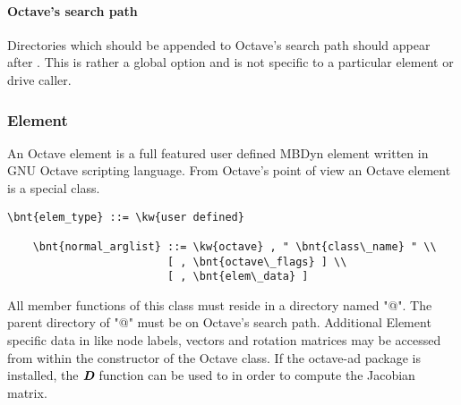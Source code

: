 \paragraph{Octave's search path}
Directories which should be appended to Octave's search path should appear after .
This is rather a global option and is not specific to a particular element or drive caller.

\subsubsection{Element}
An Octave element is a full featured user defined MBDyn element written in GNU Octave scripting language.
From Octave's point of view an Octave element is a special class.
\begin{Verbatim}[commandchars=\\\{\}]
    \bnt{elem_type} ::= \kw{user defined}

    \bnt{normal_arglist} ::= \kw{octave} , " \bnt{class\_name} " \\
                         [ , \bnt{octave\_flags} ] \\
                         [ , \bnt{elem\_data} ]
\end{Verbatim}
All member functions of this class must reside in a directory named "@".
The parent directory of "@" must be on Octave's search path.
Additional Element specific data in  like node labels, vectors and rotation matrices may be accessed from within the constructor of the Octave class. If the octave-ad package is installed, the $\textit{\textbf{D}}$ function can be used to in order to compute the Jacobian matrix.

